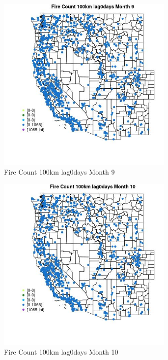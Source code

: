 \begin{figure} 
\centering  
\includegraphics[width=0.77\textwidth]{Code_Outputs/Report_ML_input_PM25_Step4_part_f_de_duplicated_aveswNAs_MapObsMo9Fire_Count_100km_lag0days.jpg} 
\caption{\label{fig:Report_ML_input_PM25_Step4_part_f_de_duplicated_aveswNAsMapObsMo9Fire_Count_100km_lag0days}Fire Count 100km lag0days Month 9} 
\end{figure} 
 

\begin{figure} 
\centering  
\includegraphics[width=0.77\textwidth]{Code_Outputs/Report_ML_input_PM25_Step4_part_f_de_duplicated_aveswNAs_MapObsMo10Fire_Count_100km_lag0days.jpg} 
\caption{\label{fig:Report_ML_input_PM25_Step4_part_f_de_duplicated_aveswNAsMapObsMo10Fire_Count_100km_lag0days}Fire Count 100km lag0days Month 10} 
\end{figure} 
 

